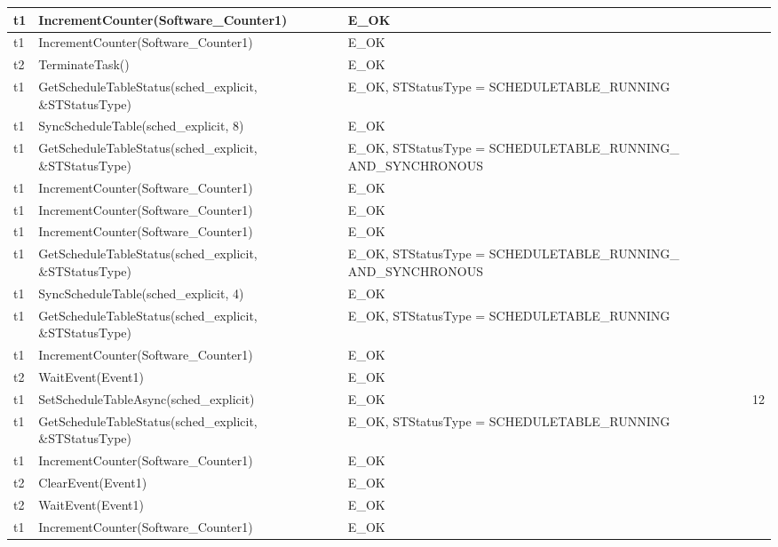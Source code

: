 \documentclass[10pt]{article}
\newlength{\Li}\settowidth{\Li}{Running}
\newlength{\Lii}\setlength{\Lii}{7cm}
\newlength{\Liiii}\setlength{\Liiii}{0.9cm}
\newlength{\Liii}\setlength{\Liii}{\textwidth} \addtolength{\Liii}{-\Li} \addtolength{\Liii}{-\Lii} \addtolength{\Liii}{-\Liiii}
\begin{document}
\begin{supertabular}{|p{\Li}|p{\Lii}|p{\Liii}|p{\Liiii}|}
	t1		& IncrementCounter(Software\_Counter1)						& E\_OK																	& \\ \hline
	t1		& IncrementCounter(Software\_Counter1)						& E\_OK																	& \\ \hline
	t2		& TerminateTask()											& E\_OK																	& \\ \hline
	t1		& GetScheduleTableStatus(sched\_explicit, \&STStatusType)			& E\_OK, STStatusType = SCHEDULETABLE\_RUNNING 							& \\ \hline
	t1		& SyncScheduleTable(sched\_explicit, 8)							& E\_OK																	& \\ \hline
	t1		& GetScheduleTableStatus(sched\_explicit, \&STStatusType)			& E\_OK, STStatusType = SCHEDULETABLE\_RUNNING\_ AND\_SYNCHRONOUS		& \\ \hline
	t1		& IncrementCounter(Software\_Counter1)						& E\_OK																	& \\ \hline
	t1		& IncrementCounter(Software\_Counter1)						& E\_OK																	& \\ \hline
	t1		& IncrementCounter(Software\_Counter1)						& E\_OK																	& \\ \hline
	t1		& GetScheduleTableStatus(sched\_explicit, \&STStatusType)			& E\_OK, STStatusType = SCHEDULETABLE\_RUNNING\_ AND\_SYNCHRONOUS		& \\ \hline
	t1		& SyncScheduleTable(sched\_explicit, 4)							& E\_OK																	& \\ \hline
	t1		& GetScheduleTableStatus(sched\_explicit, \&STStatusType)			& E\_OK, STStatusType = SCHEDULETABLE\_RUNNING 							& \\ \hline
	t1		& IncrementCounter(Software\_Counter1)						& E\_OK																	& \\ \hline
	t2		& WaitEvent(Event1)											& E\_OK																	& \\ \hline
	t1		& SetScheduleTableAsync(sched\_explicit)						& E\_OK																	& 12 \\ \hline
	t1		& GetScheduleTableStatus(sched\_explicit, \&STStatusType)			& E\_OK, STStatusType = SCHEDULETABLE\_RUNNING 							& \\ \hline
	t1		& IncrementCounter(Software\_Counter1)						& E\_OK																	& \\ \hline
	t2		& ClearEvent(Event1)										& E\_OK																	& \\ \hline
	t2		& WaitEvent(Event1)											& E\_OK																	& \\ \hline
	t1		& IncrementCounter(Software\_Counter1)						& E\_OK																	& \\ \hline

\end{supertabular}
\end{document}
